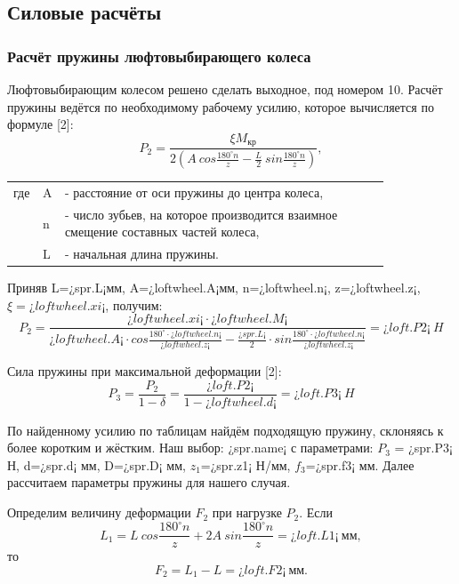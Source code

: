 \documentclass[14pt,a4paper,russian]{scrartcl}
\begin{document}
    
\subsection{Силовые расчёты}
    \subsubsection{Расчёт пружины люфтовыбирающего колеса}
        Люфтовыбирающим колесом решено сделать выходное, под номером 10.
        Расчёт пружины ведётся по необходимому рабочему усилию, которое
        вычисляется по формуле [2]:
        \[ P_2 = \frac{\xi M_{\text{кр}}}{2(A\ cos\frac{180^\circ n}{z}
                - \frac{L}{2}\ sin\frac{180^\circ n}{z})},\]
        \begin{table}[h!]
            \begin{center}
                \begin{tabular}{p{0.025\linewidth}p{0.01\linewidth}p{0.8\linewidth}}
                    где & A & - расстояние от оси пружины до центра колеса,\\
                    & n & - число зубьев, на которое производится взаимное смещение составных частей колеса,\\
                    & L & - начальная длина пружины.
                \end{tabular}
            \end{center}
        \end{table}

        Приняв L=¿spr.L¡мм, A=¿loftwheel.A¡мм, n=¿loftwheel.n¡, 
        z=¿loftwheel.z¡, \( \xi=¿loftwheel.xi¡ \), получим:
        \[ P_2 = \frac{¿loftwheel.xi¡\cdot¿loftwheel.M¡}{¿loftwheel.A¡\cdot cos\frac{180^\circ\cdot¿loftwheel.n¡}{¿loftwheel.z¡}
                - \frac{¿spr.L¡}{2}\cdot sin\frac{180^\circ\cdot¿loftwheel.n¡}{¿loftwheel.z¡}} = ¿loft.P2¡\ H\]
        
        Сила пружины при максимальной деформации [2]:
        \[ P_3 = \frac{P_2}{1-\delta} = \frac{¿loft.P2¡}{1-¿loftwheel.d¡} = ¿loft.P3¡\ H\]

        По найденному усилию по таблицам найдём подходящую пружину, склоняясь к более коротким
        и жёстким. Наш выбор: ¿spr.name¡ с параметрами: \( P_3 \) = ¿spr.P3¡ Н, d=¿spr.d¡ мм, 
        D=¿spr.D¡ мм, \( z_1 \)=¿spr.z1¡ Н/мм, \( f_3 \)=¿spr.f3¡ мм. Далее рассчитаем параметры
        пружины для нашего случая.

        Определим величину деформации \( F_2 \) при нагрузке \( P_2 \). Если 
        \[ L_1 =  L\ cos\frac{180^\circ n}{z} + 2A\ sin\frac{180^\circ n}{z} = ¿loft.L1¡\ \text{мм},\]
        то 
        \[ F_2 = L_1 - L = ¿loft.F2¡\ \text{мм}.\]
\end{document}
